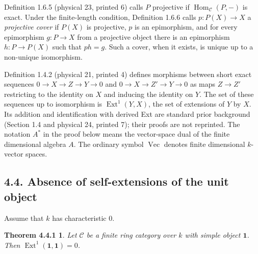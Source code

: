 \documentclass[11pt]{article}
\DeclareMathOperator{\Hom}{Hom}
\DeclareMathOperator{\Ext}{Ext}
\newcommand{\Cat}{\mathcal C}
\newcommand{\unit}{\mathbf 1}
\newcommand{\BookVec}{\operatorname{Vec}}
\newtheorem*{primarythm}{Theorem 4.4.1}
\begin{document}
Definition 1.6.5 (physical 23, printed 6) calls $P$ projective if
$\Hom_{\Cat}(P,-)$ is exact. Under the finite-length condition,
Definition 1.6.6 calls $p:P(X)\to X$ a \emph{projective cover} if
$P(X)$ is projective, $p$ is an epimorphism, and for every epimorphism
$g:P\to X$ from a projective object there is an epimorphism
$h:P\to P(X)$ such that $ph=g$. Such a cover, when it exists, is
unique up to a non-unique isomorphism.

Definition 1.4.2 (physical 21, printed 4) defines morphisms between
short exact sequences $0\to X\to Z\to Y\to0$ and
$0\to X\to Z'\to Y\to0$ as maps $Z\to Z'$ restricting to the
identity on $X$ and inducing the identity on $Y$. The set of these
sequences up to isomorphism is $\Ext^1(Y,X)$, the set of extensions
of $Y$ by $X$. Its addition and identification with derived Ext are
standard prior background (Section 1.4 and physical 24, printed 7);
their proofs are not reprinted. The notation $A^*$ in the proof below
means the vector-space dual of the finite dimensional algebra $A$.
The ordinary symbol $\BookVec$ denotes finite dimensional $k$-vector spaces.

\subsection*{4.4. Absence of self-extensions of the unit object}
Assume that $k$ has characteristic $0$.
\begin{primarythm}
Let $\Cat$ be a finite ring category over $k$ with simple object $\unit$.
Then $\Ext^1(\unit,\unit)=0$.
\end{primarythm}
\end{document}
